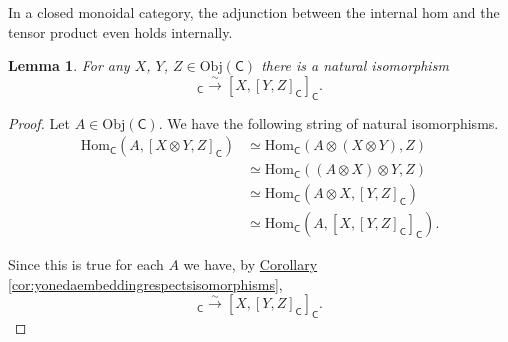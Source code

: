 \documentclass[a4paper]{report}
\newcommand{\Obj}{\mathrm{Obj}}
\newcommand{\Hom}{\mathrm{Hom}}
\theoremstyle{definition}
\theoremstyle{plain}
\newtheorem{lemma}{Lemma}[section]
\theoremstyle{remark}
\begin{document}
In a closed monoidal category, the adjunction between the internal hom and the tensor product even holds internally.
\begin{lemma}
  For any $X$, $Y$, $Z \in \Obj(\mathsf{C})$ there is a natural isomorphism
  \begin{equation*}
    [X \otimes Y, Z]_{\mathsf{C}} \stackrel{\sim}{\to} [X, [Y, Z]_{\mathsf{C}}]_{\mathsf{C}}.
  \end{equation*}
\end{lemma}
\begin{proof}
  Let $A \in \Obj(\mathsf{C})$. We have the following string of natural isomorphisms.
  \begin{align*}
    \Hom_{\mathsf{C}}(A, [X \otimes Y, Z]_{\mathsf{C}}) &\simeq \Hom_{\mathsf{C}}(A \otimes (X \otimes Y), Z) \\
    &\simeq \Hom_{\mathsf{C}}((A \otimes X) \otimes Y, Z) \\
    &\simeq \Hom_{\mathsf{C}}(A \otimes X, [Y, Z]_{\mathsf{C}}) \\
    &\simeq \Hom_{\mathsf{C}}(A, [X, [Y, Z]_{\mathsf{C}}]_{\mathsf{C}}).
  \end{align*}

  Since this is true for each $A$ we have, by \hyperref[cor:yonedaembeddingrespectsisomorphisms]{Corollary \ref*{cor:yonedaembeddingrespectsisomorphisms}},
  \begin{equation*}
    [X \otimes Y, Z]_{\mathsf{C}} \stackrel{\sim}{\to} [X, [Y, Z]_{\mathsf{C}}]_{\mathsf{C}}.
  \end{equation*}
\end{proof}
\end{document}
